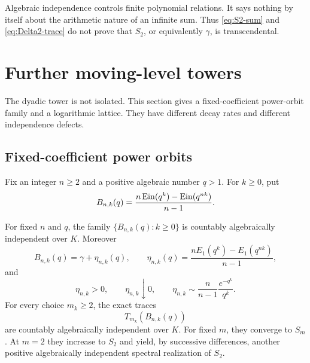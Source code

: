 \begin{remark}
Algebraic independence controls finite polynomial relations.  It says
nothing by itself about the arithmetic nature of an infinite sum.  Thus
\eqref{eq:S2-sum} and \eqref{eq:Delta2-trace} do not prove that \(S_2\), or
equivalently \(\gamma\), is transcendental.
\end{remark}

\section{Further moving-level towers}
\label{sec:other-towers}

The dyadic tower is not isolated.  This section gives a fixed-coefficient
power-orbit family and a logarithmic lattice.  They have different decay
rates and different independence defects.

\subsection{Fixed-coefficient power orbits}

Fix an integer \(n\ge2\) and a positive algebraic number \(q>1\).  For
\(k\ge0\), put
\begin{equation}\label{eq:Bnk}
 B_{n,k}(q)=
 \frac{n\operatorname{Ein}(q^k)-\operatorname{Ein}(q^{nk})}{n-1}.
\end{equation}

\begin{theorem}
\label{thm:power-orbit}
For fixed \(n\) and \(q\), the family
\(\{B_{n,k}(q):k\ge0\}\) is countably algebraically independent over \(K\).
Moreover
\begin{equation}\label{eq:eta-nk}
 B_{n,k}(q)=\gamma+\eta_{n,k}(q),\qquad
 \eta_{n,k}(q)=
 \frac{nE_1(q^k)-E_1(q^{nk})}{n-1},
\end{equation}
and
\begin{equation}\label{eq:eta-properties}
 \eta_{n,k}>0,\qquad
 \eta_{n,k}\downarrow0,\qquad
 \eta_{n,k}\sim
 \frac n{n-1}\frac{e^{-q^k}}{q^k}.
\end{equation}
For every choice \(m_k\ge2\), the exact traces
\[
 T_{m_k}(B_{n,k}(q))
\]
are countably algebraically independent over \(K\).  For fixed \(m\), they
converge to \(S_m\).  At \(m=2\) they increase to \(S_2\) and yield, by
successive differences, another positive algebraically independent spectral
realization of \(S_2\).
\end{theorem}

